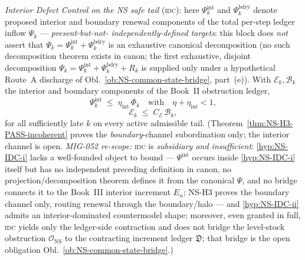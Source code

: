 \documentclass[12pt,oneside]{amsbook}
\theoremstyle{plain}
\theoremstyle{definition}
\theoremstyle{remark}
\begin{document}
\emph{Interior Defect Control on the NS safe tail} (\textsc{idc}):
here $\Psi_k^{\mathrm{int}}$ and $\Psi_k^{\mathrm{bdry}}$ denote
proposed interior and boundary renewal components of the total
per-step ledger inflow $\Psi_k$ --- \emph{present-but-not-
independently-defined targets}: this block does \emph{not} assert
that $\Psi_k = \Psi_k^{\mathrm{int}}+\Psi_k^{\mathrm{bdry}}$ is an
exhaustive canonical decomposition (no such decomposition theorem
exists in canon; the first exhaustive, disjoint decomposition
$\Psi_k = \Psi_k^{\mathrm{int}}+\Psi_k^{\mathrm{bdry}}+R_k$ is
supplied only under a hypothetical Route~A discharge of
Obl.~\ref{ob:NS-common-state-bridge}, part~(e)). With
$\mathcal{E}_k,\mathcal{B}_k$ the interior and boundary components
of the Book~II obstruction ledger,
\begin{equation}\label{hyp:NS-IDC-i}
 \Psi_k^{\mathrm{int}} \;\leq\; \eta_{\mathrm{int}}\,\Phi_k
 \quad\text{with}\quad \eta+\eta_{\mathrm{int}}<1,
\end{equation}
\begin{equation}\label{hyp:NS-IDC-ii}
 \mathcal{E}_k \;\leq\; C_{\mathcal{E}}\,\mathcal{B}_k,
\end{equation}
for all sufficiently late $k$ on every active admissible tail.
(Theorem~\ref{thm:NS-H3-PASS-incoherent} proves the
\emph{boundary}-channel subordination only; the interior channel is
open. \emph{MIG-052 re-scope:} \textsc{idc} is \emph{subsidiary
and insufficient}: \eqref{hyp:NS-IDC-i} lacks a well-founded object
to bound --- $\Psi^{\mathrm{int}}$ occurs inside
\eqref{hyp:NS-IDC-i} itself but has no independent preceding
definition in canon, no projection/decomposition theorem defines it
from the canonical $\Psi$, and no bridge connects it to the
Book~III interior increment $E_n$; NS-H3 proves the boundary
channel only, routing renewal through the boundary/halo --- and
\eqref{hyp:NS-IDC-ii} admits an interior-dominated countermodel
shape; moreover, even granted in full, \textsc{idc} yields only the
ledger-side contraction and does not bridge the level-stock
obstruction $\mathcal{O}_{\mathrm{NS}}$ to the contracting
increment ledger $\mathfrak{D}$; that bridge is the open obligation
Obl.~\ref{ob:NS-common-state-bridge}.)
\end{document}
